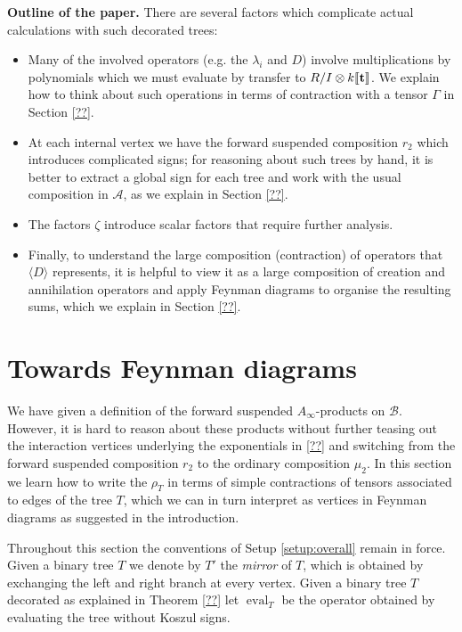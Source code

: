 \documentclass[english,letter paper,12pt,leqno]{article}
\theoremstyle{example}
\numberwithin{equation}{section}
\def\AA{\mathcal{A}}
\def\BB{\mathcal{B}}
\def\stab{\operatorname{stab}}
\begin{document}
\textbf{Outline of the paper.} There are several factors which complicate actual calculations with such decorated trees:
\begin{itemize}
\item Many of the involved operators (e.g. the $\lambda_i$ and $D$) involve multiplications by polynomials which we must evaluate by transfer to $R/I \otimes k\llbracket \bold{t} \rrbracket$. We explain how to think about such operations in terms of contraction with a tensor $\Gamma$ in Section \ref{??}.
\item At each internal vertex we have the forward suspended composition $r_2$ which introduces complicated signs; for reasoning about such trees by hand, it is better to extract a global sign for each tree and work with the usual composition in $\AA$, as we explain in Section \ref{??}.
\item The factors $\zeta$ introduce scalar factors that require further analysis.

\item Finally, to understand the large composition (contraction) of operators that $\langle D \rangle$ represents, it is helpful to view it as a large composition of creation and annihilation operators and apply Feynman diagrams to organise the resulting sums, which we explain in Section \ref{??}. %
\end{itemize}

\section{Towards Feynman diagrams}

We have given a definition of the forward suspended $A_\infty$-products on $\BB$. However, it is hard to reason about these products without further teasing out the interaction vertices underlying the exponentials in \eqref{??} and switching from the forward suspended composition $r_2$ to the ordinary composition $\mu_2$. In this section we learn how to write the $\rho_T$ in terms of simple contractions of tensors associated to edges of the tree $T$, which we can in turn interpret as vertices in Feynman diagrams as suggested in the introduction.

Throughout this section the conventions of Setup \ref{setup:overall} remain in force. Given a binary tree $T$ we denote by $T'$ the \emph{mirror} of $T$, which is obtained by exchanging the left and right branch at every vertex. Given a binary tree $T$ decorated as explained in Theorem \ref{??} let $\operatorname{eval}_T$ be the operator obtained by evaluating the tree without Koszul signs.
\end{document}
